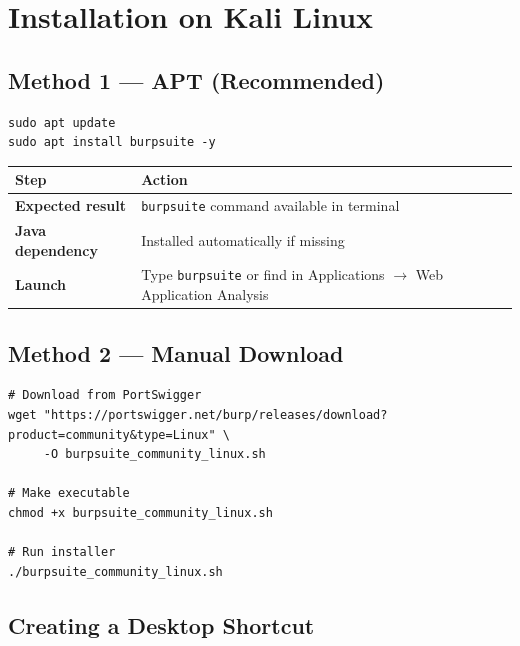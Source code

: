 
\section{Installation on Kali Linux}

\subsection{Method 1 — APT (Recommended)}

\begin{lstlisting}[style=terminal, caption={Install via apt}]
sudo apt update
sudo apt install burpsuite -y
\end{lstlisting}

\begin{table}[H]
\centering
\begin{tabularx}{\textwidth}{>{\bfseries}lX}
\toprule
Step & Action \\
\midrule
Expected result & \texttt{burpsuite} command available in terminal \\
Java dependency & Installed automatically if missing \\
Launch & Type \texttt{burpsuite} or find in Applications $\to$ Web Application Analysis \\
\bottomrule
\end{tabularx}
\end{table}

\subsection{Method 2 — Manual Download}

\begin{lstlisting}[style=terminal, caption={Download and run Burp Suite manually}]
# Download from PortSwigger
wget "https://portswigger.net/burp/releases/download?product=community&type=Linux" \
     -O burpsuite_community_linux.sh

# Make executable
chmod +x burpsuite_community_linux.sh

# Run installer
./burpsuite_community_linux.sh
\end{lstlisting}

\subsection{Creating a Desktop Shortcut}


